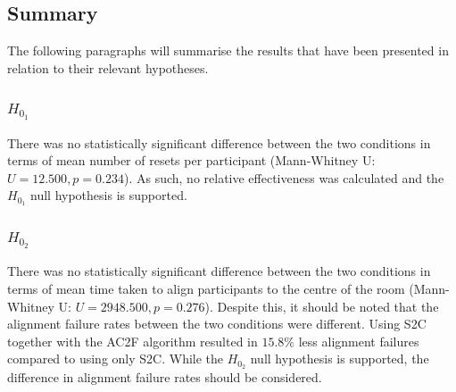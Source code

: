 \subsection{Summary}
The following paragraphs will summarise the results that have been presented in relation to their relevant hypotheses.  

\subsubsection{$H_{0_1}$}
There was no statistically significant difference between the two conditions in terms of mean number of resets per participant (Mann-Whitney U: $U = 12.500, p = 0.234$). As such, no relative effectiveness was calculated and the $H_{0_1}$ null hypothesis is supported.

\subsubsection{$H_{0_2}$}
There was no statistically significant difference between the two conditions in terms of mean time taken to align participants to the centre of the room (Mann-Whitney U: $U = 2948.500, p = 0.276$). Despite this, it should be noted that the alignment failure rates between the two conditions were different. Using S2C together with the AC2F algorithm resulted in $15.8\%$ less alignment failures compared to using only S2C. While the $H_{0_2}$ null hypothesis is supported, the difference in alignment failure rates should be considered.